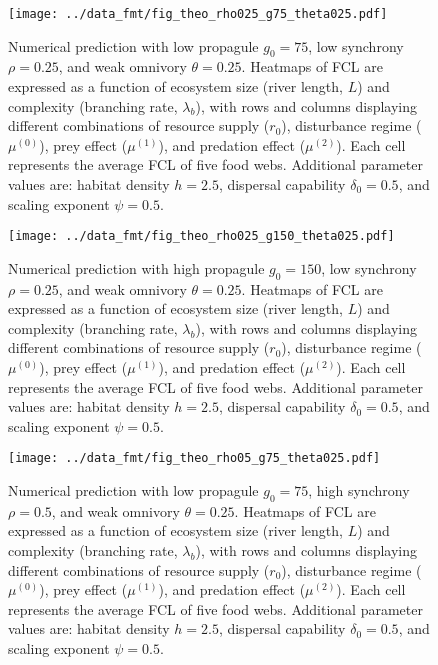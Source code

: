 \begin{figure}
\centering
\texttt{[image: ../data\_fmt/fig\_theo\_rho025\_g75\_theta025.pdf]}
\caption{\label{fig:fig-num1}Numerical prediction with low propagule
\(g_0 = 75\), low synchrony \(\rho = 0.25\), and weak omnivory
\(\theta = 0.25\). Heatmaps of FCL are expressed as a function of
ecosystem size (river length, \(L\)) and complexity (branching rate,
\(\lambda_b\)), with rows and columns displaying different combinations
of resource supply (\(r_0\)), disturbance regime (\(\mu^{(0)}\)), prey
effect (\(\mu^{(1)}\)), and predation effect (\(\mu^{(2)}\)). Each cell
represents the average FCL of five food webs. Additional parameter
values are: habitat density \(h=2.5\), dispersal capability
\(\delta_0=0.5\), and scaling exponent \(\psi=0.5\).}
\end{figure}

\newpage

\begin{figure}
\centering
\texttt{[image: ../data\_fmt/fig\_theo\_rho025\_g150\_theta025.pdf]}
\caption{\label{fig:fig-num2}Numerical prediction with high propagule
\(g_0 = 150\), low synchrony \(\rho = 0.25\), and weak omnivory
\(\theta = 0.25\). Heatmaps of FCL are expressed as a function of
ecosystem size (river length, \(L\)) and complexity (branching rate,
\(\lambda_b\)), with rows and columns displaying different combinations
of resource supply (\(r_0\)), disturbance regime (\(\mu^{(0)}\)), prey
effect (\(\mu^{(1)}\)), and predation effect (\(\mu^{(2)}\)). Each cell
represents the average FCL of five food webs. Additional parameter
values are: habitat density \(h=2.5\), dispersal capability
\(\delta_0=0.5\), and scaling exponent \(\psi=0.5\).}
\end{figure}

\newpage

\begin{figure}
\centering
\texttt{[image: ../data\_fmt/fig\_theo\_rho05\_g75\_theta025.pdf]}
\caption{\label{fig:fig-num3}Numerical prediction with low propagule
\(g_0 = 75\), high synchrony \(\rho = 0.5\), and weak omnivory
\(\theta = 0.25\). Heatmaps of FCL are expressed as a function of
ecosystem size (river length, \(L\)) and complexity (branching rate,
\(\lambda_b\)), with rows and columns displaying different combinations
of resource supply (\(r_0\)), disturbance regime (\(\mu^{(0)}\)), prey
effect (\(\mu^{(1)}\)), and predation effect (\(\mu^{(2)}\)). Each cell
represents the average FCL of five food webs. Additional parameter
values are: habitat density \(h=2.5\), dispersal capability
\(\delta_0=0.5\), and scaling exponent \(\psi=0.5\).}
\end{figure}

